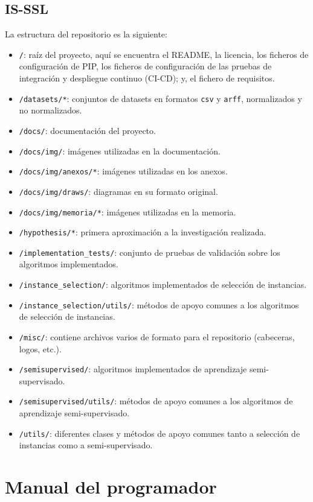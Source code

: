 \subsection{IS-SSL}
La estructura del repositorio es la siguiente:
\begin{itemize}
\tightlist
\item \texttt{/}: raíz del proyecto, aquí se encuentra el README, la licencia, los ficheros de configuración de PIP, los ficheros de configuración de las pruebas de integración y despliegue continuo (CI-CD); y, el fichero de requisitos.
\item \texttt{/datasets/*}: conjuntos de datasets en formatos \texttt{csv} y \texttt{arff}, normalizados y no normalizados.
\item \texttt{/docs/}: documentación del proyecto.
\item \texttt{/docs/img/}: imágenes utilizadas en la documentación.
\item \texttt{/docs/img/anexos/*}: imágenes utilizadas en los anexos.
\item \texttt{/docs/img/draws/}: diagramas en su formato original.
\item \texttt{/docs/img/memoria/*}: imágenes utilizadas en la memoria.
\item \texttt{/hypothesis/*}: primera aproximación a la investigación realizada.
\item \texttt{/implementation\_tests/}: conjunto de pruebas de validación sobre los algoritmos implementados.
\item \texttt{/instance\_selection/}: algoritmos implementados de selección de instancias.
\item \texttt{/instance\_selection/utils/}: métodos de apoyo comunes a los algoritmos de selección de instancias.
\item \texttt{/misc/}: contiene archivos varios de formato para el repositorio (cabeceras, logos, etc.).
\item \texttt{/semisupervised/}: algoritmos implementados de aprendizaje semi-supervisado.
\item \texttt{/semisupervised/utils/}: métodos de apoyo comunes a los algoritmos de aprendizaje semi-supervisado.
\item \texttt{/utils/}: diferentes clases y métodos de apoyo comunes tanto a selección de instancias como a semi-supervisado.
\end{itemize}

\section{Manual del programador}
